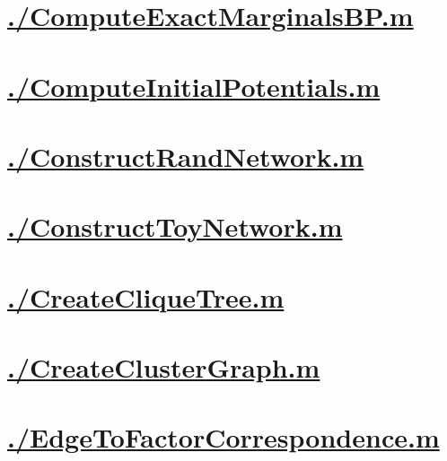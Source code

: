 \documentclass{article}
\begin{document}
    \section{\hyperref[toc]{./ComputeExactMarginalsBP.m}}
        \newpage
    \section{\hyperref[toc]{./ComputeInitialPotentials.m}}
        \newpage
    \section{\hyperref[toc]{./ConstructRandNetwork.m}}
        \newpage
    \section{\hyperref[toc]{./ConstructToyNetwork.m}}
        \newpage
    \section{\hyperref[toc]{./CreateCliqueTree.m}}
        \newpage
    \section{\hyperref[toc]{./CreateClusterGraph.m}}
        \newpage
    \section{\hyperref[toc]{./EdgeToFactorCorrespondence.m}}
        \newpage
\end{document}
